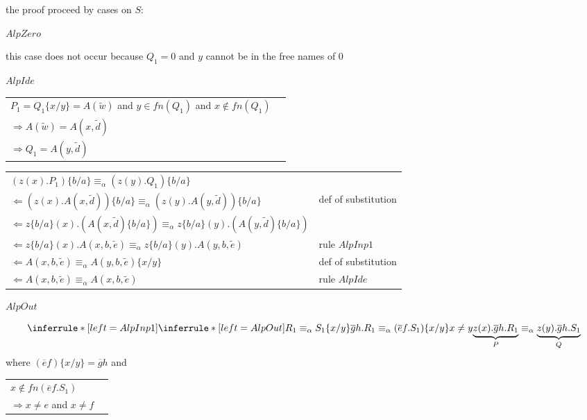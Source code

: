  		the proof proceed by cases on $S$:
 		\begin{description}
 		  \item[$AlpZero$]
 		\end{description}
 		this case does not occur because $Q_{1}=0$ and $y$ cannot be in the free names of $0$
 		\begin{description}
 		  \item[$AlpIde$]
 		\end{description}
 		\begin{center}
 		  \begin{tabular}{ll}
 		    $P_{1}=Q_{1}\{x/y\}=A(\tilde{w})$ and $y\in fn(Q_{1})$ and $x\notin fn(Q_{1})$&\\
 		    $\Rightarrow A(\tilde{w})=A(x, \tilde{d})$&\\
 		    $\Rightarrow Q_{1}=A(y, \tilde{d})$&\\
 		  \end{tabular}
 		\end{center}
 		\begin{center}
 		  \begin{tabular}{ll}
 		    $(z(x).P_{1})\{b/a\}
 		      \equiv_{\alpha}
 			(z(y).Q_{1})\{b/a\}$&\\
 		    $\Leftarrow (z(x).A(x, \tilde{d}))\{b/a\}
 		      \equiv_{\alpha}
 			(z(y).A(y, \tilde{d}))\{b/a\}$&def of substitution\\
 		    $\Leftarrow z\{b/a\}(x).(A(x, \tilde{d})\{b/a\})
 		      \equiv_{\alpha}
 			z\{b/a\}(y).(A(y, \tilde{d})\{b/a\})$&\\
 		    $\Leftarrow z\{b/a\}(x).A(x, b, \tilde{e})
 		      \equiv_{\alpha}
 			z\{b/a\}(y).A(y, b, \tilde{e})$&rule $AlpInp1$\\
 		    $\Leftarrow A(x, b, \tilde{e})
 		      \equiv_{\alpha}
 			A(y, b, \tilde{e})\{x/y\}$&def of substitution\\
 		    $\Leftarrow A(x, b, \tilde{e})
 		      \equiv_{\alpha}
 			A(x, b, \tilde{e})$&rule $AlpIde$\\
 		  \end{tabular}
 		\end{center}
 		\begin{description}
 		  \item[$AlpOut$]
 		\end{description}
 		\[\inferrule*[left=AlpInp1]{
 		    \inferrule* [left=AlpOut]{
 		      R_{1}\equiv_{\alpha} S_{1}\{x/y\}
 		    }{
 		      \overline{g}h.R_{1}\equiv_{\alpha} (\overline{e}f.S_{1})\{x/y\}
 		    }
 		  \\
 		    x\neq y	      
 		}{
 		  \underbrace{z(x).\overline{g}h.R_{1}}_{P}
 		    \equiv_{\alpha}
 		      \underbrace{z(y).\overline{g}h.S_{1}}_{Q}
 		}\]
 		where $(\overline{e}f)\{x/y\}=\overline{g}h$ and
 		\begin{center}
 		  \begin{tabular}{ll}
 		    $x\notin fn(\overline{e}f.S_{1})$&\\
 		    $\Rightarrow x\neq e $ and $x\neq f$&\\
 		  \end{tabular}
 		\end{center}
 
